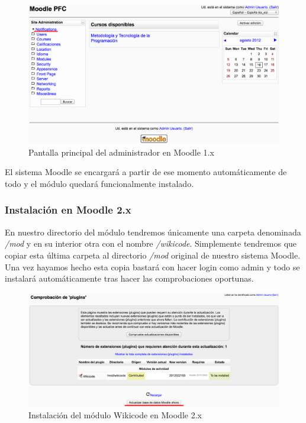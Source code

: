 \begin{figure}[h]
	\label{Notifications1x.eps}
	\includegraphics[width=\textwidth]{./img/Notifications1x.eps}
	\caption{Pantalla principal del administrador en Moodle 1.x}
\end{figure}

El sistema Moodle se encargará a partir de ese momento automáticamente de todo y el módulo quedará funcionalmente instalado.

\subsubsection{Instalación en Moodle 2.x}

En nuestro directorio del módulo tendremos únicamente una carpeta denominada \emph{/mod} y en su interior otra con el nombre \emph{/wikicode}. Simplemente tendremos que copiar esta última carpeta al directorio \emph{/mod} original de nuestro sistema Moodle. Una vez hayamos hecho esta copia bastará con hacer login como admin y todo se instalará automáticamente tras hacer las comprobaciones oportunas.

\begin{figure}[h]
	\label{installwikicode2x.eps}
	\includegraphics[width=\textwidth]{./img/installwikicode2x.eps}
	\caption{Instalación del módulo Wikicode en Moodle 2.x}
\end{figure}

